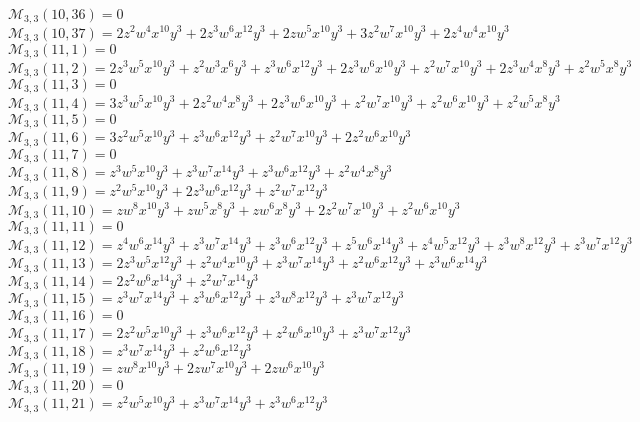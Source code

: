 $\mathcal{M}_{3,3}(10,36)=0$\\
$\mathcal{M}_{3,3}(10,37)=2z^2w^4x^{10}y^3+2z^3w^6x^{12}y^3+2zw^5x^{10}y^3+3z^2w^7x^{10}y^3+2z^4w^4x^{10}y^3$\\
$\mathcal{M}_{3,3}(11,1)=0$\\
$\mathcal{M}_{3,3}(11,2)=2z^3w^5x^{10}y^3+z^2w^3x^6y^3+z^3w^6x^{12}y^3+2z^3w^6x^{10}y^3+z^2w^7x^{10}y^3+2z^3w^4x^8y^3+z^2w^5x^8y^3$\\
$\mathcal{M}_{3,3}(11,3)=0$\\
$\mathcal{M}_{3,3}(11,4)=3z^3w^5x^{10}y^3+2z^2w^4x^8y^3+2z^3w^6x^{10}y^3+z^2w^7x^{10}y^3+z^2w^6x^{10}y^3+z^2w^5x^8y^3$\\
$\mathcal{M}_{3,3}(11,5)=0$\\
$\mathcal{M}_{3,3}(11,6)=3z^2w^5x^{10}y^3+z^3w^6x^{12}y^3+z^2w^7x^{10}y^3+2z^2w^6x^{10}y^3$\\
$\mathcal{M}_{3,3}(11,7)=0$\\
$\mathcal{M}_{3,3}(11,8)=z^3w^5x^{10}y^3+z^3w^7x^{14}y^3+z^3w^6x^{12}y^3+z^2w^4x^8y^3$\\
$\mathcal{M}_{3,3}(11,9)=z^2w^5x^{10}y^3+2z^3w^6x^{12}y^3+z^2w^7x^{12}y^3$\\
$\mathcal{M}_{3,3}(11,10)=zw^8x^{10}y^3+zw^5x^8y^3+zw^6x^8y^3+2z^2w^7x^{10}y^3+z^2w^6x^{10}y^3$\\
$\mathcal{M}_{3,3}(11,11)=0$\\
$\mathcal{M}_{3,3}(11,12)=z^4w^6x^{14}y^3+z^3w^7x^{14}y^3+z^3w^6x^{12}y^3+z^5w^6x^{14}y^3+z^4w^5x^{12}y^3+z^3w^8x^{12}y^3+z^3w^7x^{12}y^3$\\
$\mathcal{M}_{3,3}(11,13)=2z^3w^5x^{12}y^3+z^2w^4x^{10}y^3+z^3w^7x^{14}y^3+z^2w^6x^{12}y^3+z^3w^6x^{14}y^3$\\
$\mathcal{M}_{3,3}(11,14)=2z^2w^6x^{14}y^3+z^2w^7x^{14}y^3$\\
$\mathcal{M}_{3,3}(11,15)=z^3w^7x^{14}y^3+z^3w^6x^{12}y^3+z^3w^8x^{12}y^3+z^3w^7x^{12}y^3$\\
$\mathcal{M}_{3,3}(11,16)=0$\\
$\mathcal{M}_{3,3}(11,17)=2z^2w^5x^{10}y^3+z^3w^6x^{12}y^3+z^2w^6x^{10}y^3+z^3w^7x^{12}y^3$\\
$\mathcal{M}_{3,3}(11,18)=z^3w^7x^{14}y^3+z^2w^6x^{12}y^3$\\
$\mathcal{M}_{3,3}(11,19)=zw^8x^{10}y^3+2zw^7x^{10}y^3+2zw^6x^{10}y^3$\\
$\mathcal{M}_{3,3}(11,20)=0$\\
$\mathcal{M}_{3,3}(11,21)=z^2w^5x^{10}y^3+z^3w^7x^{14}y^3+z^3w^6x^{12}y^3$\\
